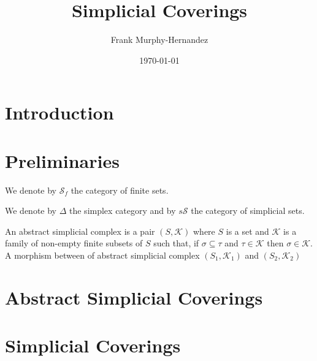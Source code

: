 \documentclass{amsart}
\begin{document}
\title{Simplicial Coverings}

\author{Frank Murphy-Hernandez}
\address{Facultad de Ciencias, UNAM, Mexico City}


\date{\today}


\begin{abstract}

\end{abstract}

\maketitle

\section*{Introduction}



\section{Preliminaries}

We denote by $\mathcal{S}_f$ the category of finite sets.

We denote by $\Delta$ the simplex category and by $s\mathcal{S}$ the category of simplicial sets.

\cite{goerss2009simplicial}
\cite{may1992simplicial}

An abstract simplicial complex is a pair $(S,\mathcal{K})$ where $S$ is a set and $\mathcal{K}$ is a family of non-empty finite subsets of $S$ such that, if $\sigma\subseteq \tau$ and $\tau\in \mathcal{K}$ then $\sigma\in\mathcal{K}$. A morphism between of abstract simplicial complex $(S_1,\mathcal{K}_1)$ and $(S_2,\mathcal{K}_2)$

\section{Abstract Simplicial Coverings}

\section{Simplicial Coverings}
\end{document}
